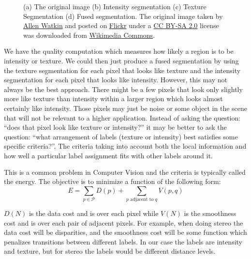 \documentclass[twocolumn]{article}
\begin{document}
\begin{figure}[!t]
\caption{(a) The original image (b) Intensity segmentation (c) Texture
Segmentation (d) Fused segmentation. The original image taken by 
\href{https://www.flickr.com/photos/allenthepostman/}
{\color{blue}Allen Watkin}
and posted on 
\href{https://www.flickr.com/photos/allenthepostman/3407703154/}
{\color{blue}Flickr} 
under a  
\href{http://creativecommons.org/licenses/by-sa/2.0}
{\color{blue}CC BY-SA 2.0} 
license 
\href{http://creativecommons.org/licenses/by-sa/2.0} 
{\ccbysa}
was downloaded from 
\href{https://commons.wikimedia.org/wiki/File\%3ABest_Friends_(3407703154).jpg}
{\color{blue}Wikimedia Commons}.
}
                              
\label{segs}
\end{figure}

We have the quality computation which measures how likely a
region is to be intensity or texture. We could then just
produce a fused segmentation by using the texture segmentation
for each pixel that looks like texture and the intensity
segmentation for each pixel that looks like
intensity. However, this may not always be the best
approach. There might be a few pixels that look only slightly
more like texture than intensity within a larger region which
looks almost certainly like intensity. Those pixels may just
be noise or some object in the scene that will not be relevant
to a higher application. Instead of asking the question:
``does that pixel look like texture or intensity?'' it may be
better to ask the question: ``what arrangement of labels
(texture or intensity) best satisfies some specific
criteria?''. The criteria taking into account both the local
information and how well a particular label assignment fits
with other labels around it. 

This is a common problem in Computer Vision and the criteria
is typically called the energy. The objective is to minimize a
function of the following form: 
\begin{equation*}
 E = \sum_{p \in \mathcal{P}} D(p) + \sum_{p \text{ adjacent to } q} V(p,q)
\end{equation*}

$D(N)$ is the data cost and is over each pixel while $V(N)$ is the
smoothness cost and is over each pair of adjacent pixels. For example,
when doing stereo the data cost will be disparities, and the
smoothness cost will be some function which penalizes transitions
between different labels. In our case the labels are intensity and
texture, but for stereo the labels would be different distance
levels. 
\end{document}
